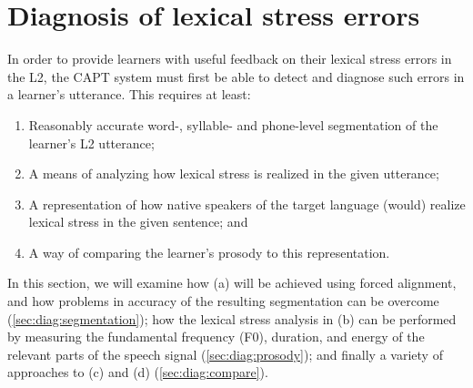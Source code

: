 %
%
\chapter{Diagnosis of lexical stress errors}
\label{chap:diagnosis}


In order to provide learners with useful feedback on their lexical stress errors in the L2, the CAPT system must first be able to detect and diagnose such errors in a learner's utterance. This requires at least:
\begin{enumerate}[label=(\alph*)]
\item Reasonably accurate word-, syllable- and phone-level segmentation of the learner's L2 utterance; %
\item A means of analyzing how lexical stress is realized in the
given
utterance;
\item A representation of how native speakers of the target language (would) realize  lexical stress in the given sentence; and
\item A way of comparing the learner's prosody to this representation. 
\end{enumerate}

In this section, we will examine how (a) will be achieved using
 forced alignment, %
 and how problems in accuracy of the resulting segmentation can be overcome (\cref{sec:diag:segmentation}); how the lexical stress analysis in (b) can be performed by measuring the fundamental frequency (F0), duration, and energy of the relevant parts of the speech signal (\cref{sec:diag:prosody}); and finally a variety of approaches to (c) and (d) (\cref{sec:diag:compare}).

%
%	

